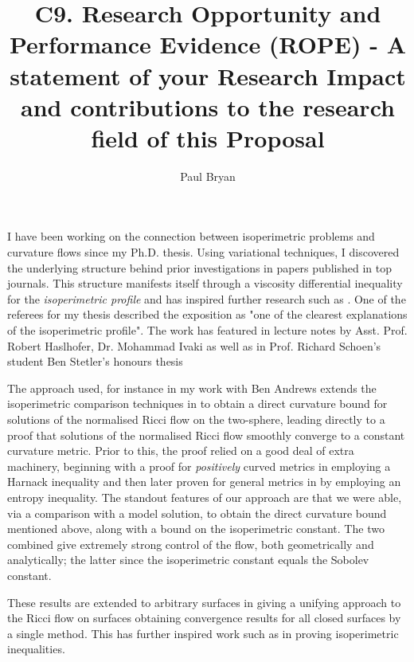 \documentclass[12pt]{amsart}
\date{}
\author{Paul Bryan}
\title{C9. Research Opportunity and Performance Evidence (ROPE) - A statement of your Research Impact and contributions to the research field of this Proposal}
\begin{document}
I have been working on the connection between isoperimetric problems and curvature flows since my Ph.D. thesis. Using variational techniques, I discovered the underlying structure behind prior investigations \cite{MR1369140,MR1369139,MR1656553,Bryan} in papers published in top journals. This structure manifests itself through a viscosity differential inequality for the \emph{isoperimetric profile} and has inspired further research such as \cite{MR3544942, MR3570462}. One of the referees for my thesis described the exposition as "one of the clearest explanations of the isoperimetric profile". The work has featured in lecture notes by Asst. Prof. Robert Haslhofer, Dr. Mohammad Ivaki as well as in Prof. Richard Schoen's student Ben Stetler's honours thesis

The approach used, for instance in my work with Ben Andrews \cite{MR2729306} extends the isoperimetric comparison techniques in \cite{MR1369140,MR1369139} to obtain a direct curvature bound for solutions of the normalised Ricci flow on the two-sphere, leading directly to a proof that solutions of the normalised Ricci flow smoothly converge to a constant curvature metric. Prior to this, the proof relied on a good deal of extra machinery, beginning with a proof for \emph{positively} curved metrics in \cite{MR954419} employing a Harnack inequality and then later proven for general metrics in \cite{MR1094458} by employing an entropy inequality. The standout features of our approach are that we were able, via a comparison with a model solution, to obtain the direct curvature bound mentioned above, along with a bound on the isoperimetric constant. The two combined give extremely strong control of the flow, both geometrically and analytically; the latter since the isoperimetric constant equals the Sobolev constant.

These results are extended to arbitrary surfaces in \cite{Bryan} giving a unifying approach to the Ricci flow on surfaces obtaining convergence results for all closed surfaces by a single method. This has further inspired work such as \cite{2014arXiv1411.2672N} in proving isoperimetric inequalities.
\end{document}
